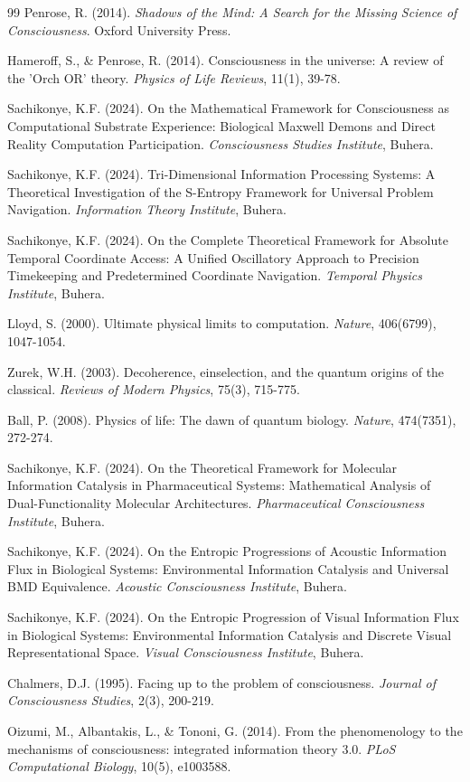 \documentclass[12pt,a4paper]{article}
\theoremstyle{remark}
\begin{document}
\begin{thebibliography}{99}
Penrose, R. (2014). \textit{Shadows of the Mind: A Search for the Missing Science of Consciousness}. Oxford University Press.

Hameroff, S., \& Penrose, R. (2014). Consciousness in the universe: A review of the 'Orch OR' theory. \textit{Physics of Life Reviews}, 11(1), 39-78.

Sachikonye, K.F. (2024). On the Mathematical Framework for Consciousness as Computational Substrate Experience: Biological Maxwell Demons and Direct Reality Computation Participation. \textit{Consciousness Studies Institute}, Buhera.

Sachikonye, K.F. (2024). Tri-Dimensional Information Processing Systems: A Theoretical Investigation of the S-Entropy Framework for Universal Problem Navigation. \textit{Information Theory Institute}, Buhera.

Sachikonye, K.F. (2024). On the Complete Theoretical Framework for Absolute Temporal Coordinate Access: A Unified Oscillatory Approach to Precision Timekeeping and Predetermined Coordinate Navigation. \textit{Temporal Physics Institute}, Buhera.

Lloyd, S. (2000). Ultimate physical limits to computation. \textit{Nature}, 406(6799), 1047-1054.

Zurek, W.H. (2003). Decoherence, einselection, and the quantum origins of the classical. \textit{Reviews of Modern Physics}, 75(3), 715-775.

Ball, P. (2008). Physics of life: The dawn of quantum biology. \textit{Nature}, 474(7351), 272-274.

Sachikonye, K.F. (2024). On the Theoretical Framework for Molecular Information Catalysis in Pharmaceutical Systems: Mathematical Analysis of Dual-Functionality Molecular Architectures. \textit{Pharmaceutical Consciousness Institute}, Buhera.

Sachikonye, K.F. (2024). On the Entropic Progressions of Acoustic Information Flux in Biological Systems: Environmental Information Catalysis and Universal BMD Equivalence. \textit{Acoustic Consciousness Institute}, Buhera.

Sachikonye, K.F. (2024). On the Entropic Progression of Visual Information Flux in Biological Systems: Environmental Information Catalysis and Discrete Visual Representational Space. \textit{Visual Consciousness Institute}, Buhera.

Chalmers, D.J. (1995). Facing up to the problem of consciousness. \textit{Journal of Consciousness Studies}, 2(3), 200-219.

Oizumi, M., Albantakis, L., \& Tononi, G. (2014). From the phenomenology to the mechanisms of consciousness: integrated information theory 3.0. \textit{PLoS Computational Biology}, 10(5), e1003588.

\end{thebibliography}
\end{document}
